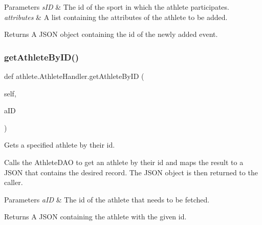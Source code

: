 \begin{DoxyParams}{Parameters}
{\em s\+ID} & The id of the sport in which the athlete participates. \\
\hline
{\em attributes} & A list containing the attributes of the athlete to be added. \\
\hline
\end{DoxyParams}
\begin{DoxyReturn}{Returns}
A J\+S\+ON object containing the id of the newly added event. 
\end{DoxyReturn}
\mbox{\label{classathlete_1_1_athlete_handler_ac9887da05dcb05758b2b423e7778d504}} 
\subsubsection{\texorpdfstring{get\+Athlete\+By\+I\+D()}{getAthleteByID()}}
{\footnotesize\ttfamily def athlete.\+Athlete\+Handler.\+get\+Athlete\+By\+ID (\begin{DoxyParamCaption}\item[{}]{self,  }\item[{}]{a\+ID }\end{DoxyParamCaption})}



Gets a specified athlete by their id. 

Calls the Athlete\+D\+AO to get an athlete by their id and maps the result to a J\+S\+ON that contains the desired record. The J\+S\+ON object is then returned to the caller.


\begin{DoxyParams}{Parameters}
{\em a\+ID} & The id of the athlete that needs to be fetched.\\
\hline
\end{DoxyParams}
\begin{DoxyReturn}{Returns}
A J\+S\+ON containing the athlete with the given id. 
\end{DoxyReturn}
\mbox{\label{classathlete_1_1_athlete_handler_a915847d82761dec34fdea02e9c3c6a6b}} 
